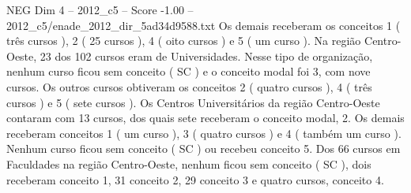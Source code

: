 \begin{textsample}{NEG Dim 4 – 2012\_c5 – Score -1.00 – 2012\_c5/enade\_2012\_dir\_5ad34d9588.txt}
Os demais receberam os conceitos 1 ( três cursos ), 2 ( 25 cursos ), 4 ( oito cursos ) e 5 ( um curso ).
Na região Centro-Oeste, 23 dos 102 cursos eram de Universidades.
Nesse tipo de organização, nenhum curso ficou sem conceito ( SC ) e o conceito modal foi 3, com nove cursos.
Os outros cursos obtiveram os conceitos 2 ( quatro cursos ), 4 ( três cursos ) e 5 ( sete cursos ).
Os Centros Universitários da região Centro-Oeste contaram com 13 cursos, dos quais sete receberam o conceito modal, 2.
Os demais receberam conceitos 1 ( um curso ), 3 ( quatro cursos ) e 4 ( também um curso ).
Nenhum curso ficou sem conceito ( SC ) ou recebeu conceito 5.
Dos 66 cursos em Faculdades na região Centro-Oeste, nenhum ficou sem conceito ( SC ), dois receberam conceito 1, 31 conceito 2, 29 conceito 3 e quatro cursos, conceito 4.

\end{textsample}
